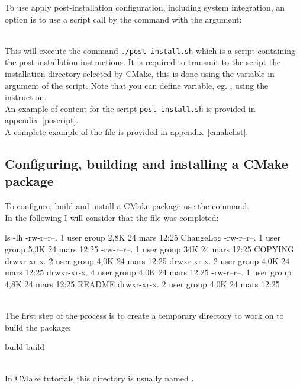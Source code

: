To use apply post-installation configuration, including system integration, an option is to use a script call by the  command with 
the  argument: 
{\footnotesize{
\begin{script}

\end{script}
}}
\\[-0.5cm]
This will execute the command \texttt{./post-install.sh} which is a script containing the post-installation instructions. 
It is required to transmit to the script the installation directory selected by CMake, this is done using the variable 
in argument of the script. 
Note that you can define variable, eg. , using the  instruction. \\
An example of content for the script \texttt{post-install.sh} is provided in appendix~\ref{poscript}. \\[0.25cm]
A complete example of the file  is provided in appendix~\ref{cmakelist}.

\subsection{Configuring, building and installing a CMake package}

To configure, build and install a CMake package use the  command. \\
In the following I will consider that the file  was completed: 
{\footnotesize{
\begin{script}
 ls -lh
-rw-r--r--. 1 user group 2,8K 24 mars  12:25 ChangeLog
-rw-r--r--. 1 user group 5,3K 24 mars  12:25 
-rw-r--r--. 1 user group  34K 24 mars  12:25 COPYING
drwxr-xr-x. 2 user group 4,0K 24 mars  12:25 
drwxr-xr-x. 2 user group 4,0K 24 mars  12:25 
drwxr-xr-x. 4 user group 4,0K 24 mars  12:25 
-rw-r--r--. 1 user group 4,8K 24 mars  12:25 README
drwxr-xr-x. 2 user group 4,0K 24 mars  12:25 
\end{script}
}}\\[-0.25cm]
\noindent The first step of the process is to create a temporary directory to work on to build the package:
{\footnotesize{
\begin{script}
  build
  build
\end{script}
}}\\[-0.25cm]
\noindent In CMake tutorials this directory is usually named . 

